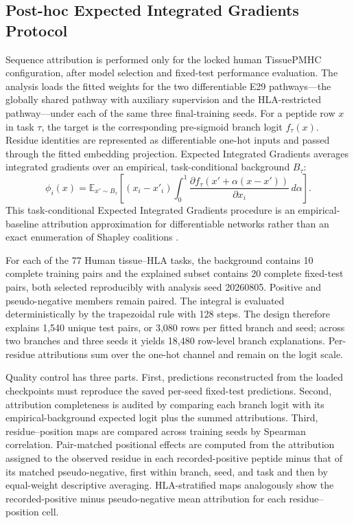 \subsection{Post-hoc Expected Integrated Gradients Protocol}

Sequence attribution is performed only for the locked human TissuePMHC configuration, after model selection and fixed-test performance evaluation. The analysis loads the fitted weights for the two differentiable E29 pathways---the globally shared pathway with auxiliary supervision and the HLA-restricted pathway---under each of the same three final-training seeds. For a peptide row \(x\) in task \(\tau\), the target is the corresponding pre-sigmoid branch logit \(f_{\tau}(x)\). Residue identities are represented as differentiable one-hot inputs and passed through the fitted embedding projection. Expected Integrated Gradients averages integrated gradients over an empirical, task-conditional background \(B_{\tau}\):
\[
\phi_i(x)=
\mathbb{E}_{x'\sim B_{\tau}}
\left[(x_i-x'_i)
\int_0^1
\frac{\partial f_{\tau}\!\left(x'+\alpha(x-x')\right)}{\partial x_i}
\,d\alpha\right].
\]
This task-conditional Expected Integrated Gradients procedure is an empirical-baseline attribution approximation for differentiable networks rather than an exact enumeration of Shapley coalitions \cite{lundberg2017shap,sundararajan2017integrated,erion2021expected}.

For each of the 77 Human tissue--HLA tasks, the background contains 10 complete training pairs and the explained subset contains 20 complete fixed-test pairs, both selected reproducibly with analysis seed 20260805. Positive and pseudo-negative members remain paired. The integral is evaluated deterministically by the trapezoidal rule with 128 steps. The design therefore explains 1,540 unique test pairs, or 3,080 rows per fitted branch and seed; across two branches and three seeds it yields 18,480 row-level branch explanations. Per-residue attributions sum over the one-hot channel and remain on the logit scale.

Quality control has three parts. First, predictions reconstructed from the loaded checkpoints must reproduce the saved per-seed fixed-test predictions. Second, attribution completeness is audited by comparing each branch logit with its empirical-background expected logit plus the summed attributions. Third, residue--position maps are compared across training seeds by Spearman correlation. Pair-matched positional effects are computed from the attribution assigned to the observed residue in each recorded-positive peptide minus that of its matched pseudo-negative, first within branch, seed, and task and then by equal-weight descriptive averaging. HLA-stratified maps analogously show the recorded-positive minus pseudo-negative mean attribution for each residue--position cell.

